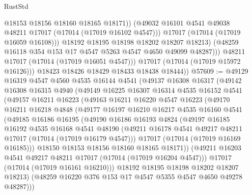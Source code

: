 \begin{lexlean}{RustStd}
\begin{coremodule}
{\begin{coremodule}
{{{{{{{{{{{{{{{{{{{{{{{{{{{{{{{{{{{{{{{{{{{{{{{{{{{{{{{                        @18153
                        @18156
                        @18160
                        @18165
                        @18171))
                    (@49032 @16101 @4541 @49038 @48211 @17017 (@17014 (@17019 @16102 @4547)))
                    @17017
                    (@17014 (@17019 @16059 @16108)))
                  @18192
                  @18195
                  @18198
                  @18202
                  @18207
                  @18213)
                (@48259 @16118 @354 @153 @17 @4547 @5263 @4547 @4650 @49099 @48287)))
            @48211
            @17017
            (@17014 (@17019 @16051 @4547)))
          @17017
          (@17014 (@17019 @15972 @16126)))
        @18423
        @18426
        @18429
        @18433
        @18438
        @18444))
@57609 := @49129
    @16319
    @4547
    @4560
    @4535
    @16144
    @4541
    (@49137
      @16308
      @16317
      (@49142
        @16308
        @16315
        @4940
        (@49149
          @16225
          @16307
          @16314
          @4535
          @16152
          @4541
          (@49157
            @16211
            @16223
            (@49163
              @16211
              @16220
              @4547
              @16223
              (@49170
                @16211
                @16218
                @4848
                (@49177
                  @16197
                  @16210
                  @16217
                  @4535
                  @16160
                  @4541
                  (@49185
                    @16186
                    @16195
                    (@49190
                      @16186
                      @16193
                      @4824
                      (@49197
                        @16185
                        @16192
                        @4535
                        @16168
                        @4541
                        @48190
                        (@49211 @16178 @4541 @49217 @48211 @17017 (@17014 (@17019 @16179 @4547)))
                        @17017
                        (@17014 (@17019 @16169 @16185)))
                      @18150
                      @18153
                      @18156
                      @18160
                      @18165
                      @18171))
                  (@49211 @16203 @4541 @49217 @48211 @17017 (@17014 (@17019 @16204 @4547)))
                  @17017
                  (@17014 (@17019 @16161 @16210)))
                @18192
                @18195
                @18198
                @18202
                @18207
                @18213)
              (@48259 @16220 @376 @153 @17 @4547 @5355 @4547 @4650 @49278 @48287)))
}}}}}}}}}}}}}}}}}}}}}}}}}}}}}}}}}}}}}}}}}}}}}}}}}}}}}}}
\end{coremodule}}
\end{coremodule}
\end{lexlean}
